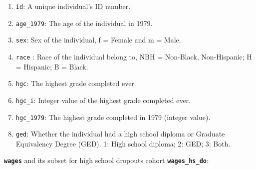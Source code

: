 \documentclass[12pt]{article}
\providecommand{\tightlist}{%
  \setlength{\itemsep}{0pt}\setlength{\parskip}{0pt}}
\begin{document}
\begin{enumerate}
\def\labelenumi{\arabic{enumi}.}
\tightlist
\item
  \texttt{id}: A unique individual's ID number.
\item
  \texttt{age\_1979}: The age of the individual in 1979.
\item
  \texttt{sex}: Sex of the individual, f = Female and m = Male.
\item
  \texttt{race} : Race of the individual belong to, NBH = Non-Black, Non-Hispanic; H = Hispanic; B = Black.
\item
  \texttt{hgc}: The highest grade completed ever.
\item
  \texttt{hgc\_i}: Integer value of the highest grade completed ever.
\item
  \texttt{hgc\_1979}: The highest grade completed in 1979 (integer value).
\item
  \texttt{ged}: Whether the individual had a high school diploma or Graduate Equivalency Degree (GED). 1: High school diploma; 2: GED; 3: Both.
\end{enumerate}

\textbf{\texttt{wages}} and its subset for high school dropouts cohort \textbf{\texttt{wages\_hs\_do}}:
\end{document}
